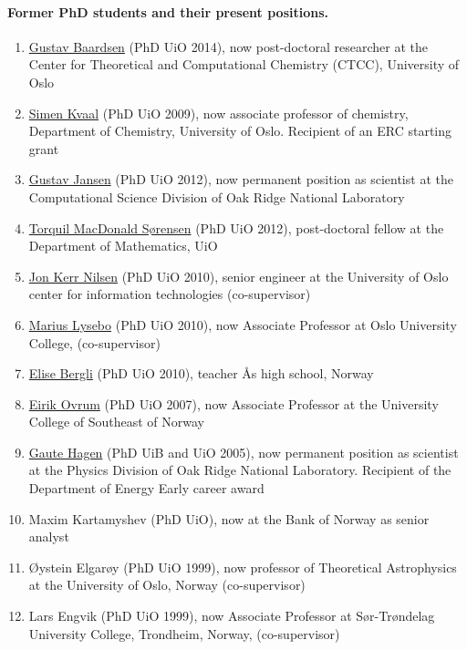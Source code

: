 \documentclass[a4wide,10pt]{article}
\begin{document}
\paragraph{Former PhD students and their present positions.}
\begin{enumerate}
\item \href{{http://www.ctcc.no/people/postdocs/gba/}}{Gustav Baardsen} (PhD UiO 2014), now post-doctoral researcher at the Center for Theoretical and Computational Chemistry (CTCC), University of Oslo 

\item \href{{http://www.mn.uio.no/kjemi/english/people/aca/simenkv/index.html}}{Simen Kvaal} (PhD UiO 2009), now associate professor of chemistry, Department of Chemistry, University of Oslo. Recipient of an ERC starting grant

\item \href{{https://www.ornl.gov/staff-profile/gustav-r-jansen}}{Gustav Jansen} (PhD UiO 2012), now permanent position as scientist at the Computational Science Division of Oak Ridge National Laboratory  

\item \href{{http://www.mn.uio.no/math/english/people/aca/tmac/}}{Torquil MacDonald Sørensen} (PhD UiO 2012), post-doctoral fellow at the Department of Mathematics, UiO

\item \href{{http://www.usit.uio.no/english/about/organisation/bps/rc/ris/staff/jonkni/}}{Jon Kerr Nilsen} (PhD UiO 2010), senior engineer at the University of Oslo center for information technologies (co-supervisor)

\item \href{{https://www.hioa.no/tilsatt/marlys}}{Marius Lysebo} (PhD UiO 2010), now Associate Professor at Oslo University College, (co-supervisor)

\item \href{{http://www.aas.vgs.no/om-oss/organisasjon/alle-ansatte/}}{Elise Bergli} (PhD UiO 2010), teacher Ås high school, Norway

\item \href{{https://www.hbv.no/om-hbv-kontakt-oss-ansatte/eirik-ovrum-article125026-6688.html}}{Eirik Ovrum} (PhD UiO 2007), now Associate Professor at the University College of Southeast of Norway

\item \href{{https://www.ornl.gov/staff-profile/gaute-hagen}}{Gaute Hagen} (PhD UiB and UiO 2005), now permanent position as scientist at the Physics Division of Oak Ridge National Laboratory. Recipient of the Department of Energy Early career award

\item Maxim Kartamyshev (PhD UiO), now at the Bank of Norway as senior analyst

\item Øystein Elgarøy (PhD UiO 1999), now professor of Theoretical Astrophysics at the University of Oslo, Norway (co-supervisor)

\item Lars Engvik (PhD UiO 1999), now Associate Professor at Sør-Trøndelag University College, Trondheim, Norway, (co-supervisor)
\end{enumerate}
\end{document}
